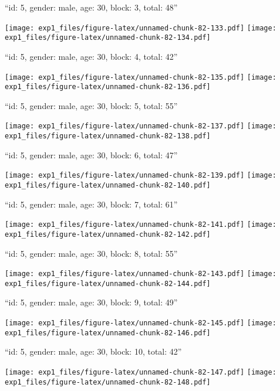 \documentclass[11pt,,]{article}
\begin{document}
\newpage
[1] 

``id: 5, gender: male, age: 30, block: 3, total: 48''

\texttt{[image: exp1\_files/figure-latex/unnamed-chunk-82-133.pdf]}
\texttt{[image: exp1\_files/figure-latex/unnamed-chunk-82-134.pdf]}

\newpage
[1] 

``id: 5, gender: male, age: 30, block: 4, total: 42''

\texttt{[image: exp1\_files/figure-latex/unnamed-chunk-82-135.pdf]}
\texttt{[image: exp1\_files/figure-latex/unnamed-chunk-82-136.pdf]}

\newpage
[1] 

``id: 5, gender: male, age: 30, block: 5, total: 55''

\texttt{[image: exp1\_files/figure-latex/unnamed-chunk-82-137.pdf]}
\texttt{[image: exp1\_files/figure-latex/unnamed-chunk-82-138.pdf]}

\newpage
[1] 

``id: 5, gender: male, age: 30, block: 6, total: 47''

\texttt{[image: exp1\_files/figure-latex/unnamed-chunk-82-139.pdf]}
\texttt{[image: exp1\_files/figure-latex/unnamed-chunk-82-140.pdf]}

\newpage
[1] 

``id: 5, gender: male, age: 30, block: 7, total: 61''

\texttt{[image: exp1\_files/figure-latex/unnamed-chunk-82-141.pdf]}
\texttt{[image: exp1\_files/figure-latex/unnamed-chunk-82-142.pdf]}

\newpage
[1] 

``id: 5, gender: male, age: 30, block: 8, total: 55''

\texttt{[image: exp1\_files/figure-latex/unnamed-chunk-82-143.pdf]}
\texttt{[image: exp1\_files/figure-latex/unnamed-chunk-82-144.pdf]}

\newpage
[1] 

``id: 5, gender: male, age: 30, block: 9, total: 49''

\texttt{[image: exp1\_files/figure-latex/unnamed-chunk-82-145.pdf]}
\texttt{[image: exp1\_files/figure-latex/unnamed-chunk-82-146.pdf]}

\newpage
[1] 

``id: 5, gender: male, age: 30, block: 10, total: 42''

\texttt{[image: exp1\_files/figure-latex/unnamed-chunk-82-147.pdf]}
\texttt{[image: exp1\_files/figure-latex/unnamed-chunk-82-148.pdf]}
\end{document}
